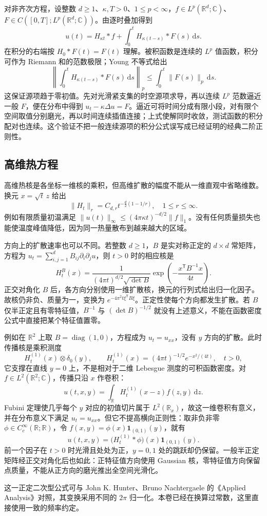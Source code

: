 对非齐次方程，设整数 \(d\geq1\)、\(\kappa,T>0\)、\(1\leq p<\infty\)，\(f\in L^p(\mathbb R^d;\mathbb C)\)、\(F\in C([0,T];L^p(\mathbb R^d;\mathbb C))\)。由逐时叠加得到
\begin{equation}\label{b2:eq:12-duhamel}
 u(t)=H_{\kappa t}*f+
 \int_0^tH_{\kappa(t-s)}*F(s)\,\mathrm{d}s.
\end{equation}
在积分的右端按 \(H_0*F(t)=F(t)\) 理解。被积函数是连续的 \(L^p\) 值函数，积分可作为 Riemann 和的范数极限；Young 不等式给出
\[
 \left\|\int_0^tH_{\kappa(t-s)}*F(s)\,\mathrm{d}s\right\|_p
 \leq\int_0^t\|F(s)\|_p\,\mathrm{d}s.
\]
这保证源项趋于零初值。先对光滑紧支集的时空源项求导，再以连续 \(L^p\) 范数逼近一般 \(F\)，便在分布中得到 \(u_t-\kappa\Delta u=F\)。逼近可将时间分成有限小段，对有限个空间取值分别磨光，再以时间连续插值连接；上式使解同时收敛，测试函数的积分配对也连续。这个验证不把一般连续源项的积分公式误写成已经证明的经典二阶正则性。

\subsection{高维热方程}
\label{b2:subsec:120203}

高维热核是各坐标一维核的乘积，但高维扩散的幅度不能从一维直观中省略维数。换元 \(x=\sqrt t\,z\) 给出
\[
 \|H_t\|_r=C_{d,r}t^{-\frac d2(1-1/r)},
 \quad1\leq r\leq\infty.
\]
例如有限质量初温满足 \(\|u(t)\|_\infty\leq(4\pi\kappa t)^{-d/2}\|f\|_1\)。没有任何质量损失也能使温度峰值降低，因为同一热量散布到越来越大的区域。

\ProseParagraphBreak

方向上的扩散速率也可以不同。若整数 \(d\geq1\)，\(B\) 是实对称正定的 \(d\times d\) 常矩阵，方程为 \(u_t=\sum_{i,j=1}^dB_{ij}\partial_i\partial_ju\)，则 \(t>0\) 时的相应核是
\[
 H_t^B(x)=\dfrac1{(4\pi t)^{d/2}\sqrt{\det B}}
 \exp\left(-\dfrac{x^{\mathsf T}B^{-1}x}{4t}\right).
\]
正交对角化 \(B\) 后，各方向分别使用一维扩散核，换元的行列式给出归一化因子。故核仍非负、质量为一，变换为 \(e^{-4\pi^2t\xi^{\mathsf T}B\xi}\)。正定性使每个方向都发生扩散。若 \(B\) 仅半正定且有零特征值，\(B^{-1}\) 与 \((\det B)^{-1/2}\) 就没有上述意义，不能在函数密度公式中直接把某个特征值置零。

\ProseParagraphBreak

例如在 \(\mathbb R^2\) 上取 \(B=\operatorname{diag}(1,0)\)，方程成为 \(u_t=u_{xx}\)，没有 \(y\) 方向的扩散。此时传播核是乘积测度
\[
 H_t^{(1)}(x)\otimes\delta_0(y),\qquad
 H_t^{(1)}(x)=(4\pi t)^{-1/2}e^{-x^2/(4t)},\quad t>0,
\]
它支撑在直线 \(y=0\) 上，不是相对于二维 Lebesgue 测度的可积函数密度。对 \(f\in L^2(\mathbb R^2;\mathbb C)\)，传播只沿 \(x\) 作卷积：
\[
 u(t,x,y)=\int_{\mathbb R}H_t^{(1)}(x-z)f(z,y)\,\mathrm{d}z.
\]
Fubini 定理使几乎每个 \(y\) 对应的初值切片属于 \(L^2(\mathbb R_x)\)，故这一维卷积有意义，并在分布意义下满足 \(u_t=u_{xx}\)。但它不提高横向正则性：取非负非零 \(\phi\in C_c^\infty(\mathbb R;\mathbb R)\)，令 \(f(x,y)=\phi(x)\mathbf1_{(0,1)}(y)\)，就有
\[
 u(t,x,y)=\bigl(H_t^{(1)}*\phi\bigr)(x)\mathbf1_{(0,1)}(y).
\]
前一个因子在 \(t>0\) 时光滑且处处为正，\(y=0,1\) 处的跳跃却仍保留。一般半正定矩阵经正交对角化后也如此：正特征值方向使用 Gaussian 核，零特征值方向保留点质量，不能从正方向的磨光推出全空间光滑化。

\ProseParagraphBreak

这一正定二次型公式可与 John K. Hunter、Bruno Nachtergaele 的《Applied Analysis》\cite[pp. 303--304]{Hunter2001Applied}对照，其变换采用不同的 \(2\pi\) 归一化。本卷已经在换算过常数，这里直接使用一致的频率约定。
